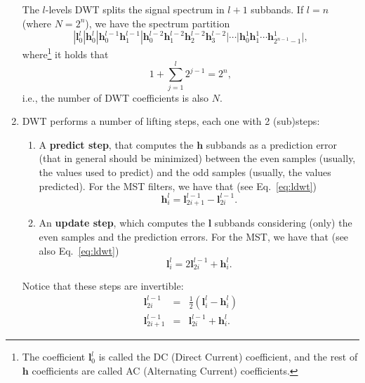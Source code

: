 \begin{enumerate}
  The $l$-levels DWT splits the signal spectrum in $l+1$ subbands. If
  $l=n$ (where $N=2^n$), we have the spectrum partition
  \begin{equation*}
    | {\mathbf l}^l_0 | {\mathbf h}^l_0 | {\mathbf h}^{l-1}_0 {\mathbf h}^{l-1}_1 | {\mathbf h}^{l-2}_0 {\mathbf h}^{l-2}_1 {\mathbf h}^{l-2}_2 {\mathbf h}^{l-2}_3 | \cdots | {\mathbf h}^1_0 {\mathbf h}^1_1 \cdots {\mathbf h}^1_{2^{n-1}-1} |,
  \end{equation*}
  where\footnote{The coefficient ${\mathbf l}^l_0$ is called the DC
    (Direct Current) coefficient, and the rest of ${\mathbf h}$
    coefficients are called AC (Alternating Current) coefficients.} it
  holds that
  \begin{equation}
    1+\sum_{j=1}^l 2^{j-1}=2^n,
  \end{equation}
  i.e., the number of DWT coefficients is also $N$.

\item DWT performs a number of lifting steps, each one with
  2 (sub)steps:
  \begin{enumerate}
  \item A \textbf{predict step}, that computes the ${\mathbf h}$
    subbands as a prediction error (that in general should be
    minimized) between the even samples (usually, the values used to
    predict) and the odd samples (usually, the values predicted). For
    the MST filters, we have that (see Eq.~\ref{eq:ldwt})
    \begin{equation}
      {\mathbf h}^l_i = {\mathbf l}^{l-1}_{2i+1} - {\mathbf l}^{l-1}_{2i}.
    \end{equation}
    
  \item An \textbf{update step}, which computes the ${\mathbf l}$
    subbands considering (only) the even samples and the prediction
    errors. For the MST, we have that (see also Eq.~\ref{eq:ldwt})
    \begin{equation}
      {\mathbf l}^l_i = 2{\mathbf l}^{l-1}_{2i} + {\mathbf h}^l_i.
    \end{equation}
  \end{enumerate}

  Notice that these steps are invertible:
  \begin{equation}
    \begin{array}{rcl}
      {\mathbf l}^{l-1}_{2i} & = & \frac{1}{2}({\mathbf l}^l_i - {\mathbf h}^l_i)\\
      {\mathbf l}^{l-1}_{2i+1} & = & {\mathbf l}^{l-1}_{2i} + {\mathbf h}^l_i.
    \end{array}
  \end{equation}

\end{enumerate}

